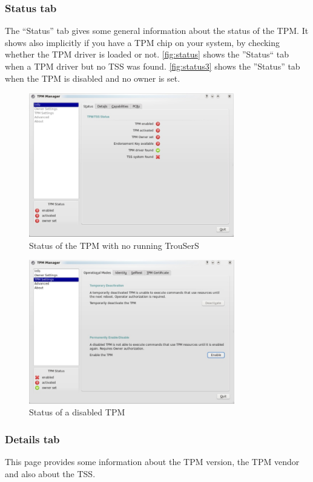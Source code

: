 \documentclass[
  american        %
]{sirrixreport}
\begin{document}
\subsubsection{Status tab} The ``Status'' tab gives some general information about the status of the TPM.
It shows also implicitly if you have a TPM chip on your system, by checking whether the TPM driver is loaded or not. \autoref{fig:status} shows the ''Status`` tab when a TPM driver but no TSS was found. \autoref{fig:status3} shows the ''Status'' tab when the TPM is disabled and no owner is set.
\begin{figure}[h]
 \centering
   \includegraphics[width=0.8\textwidth]{images/man_statnotrousers}
   \caption{Status of the TPM with no running TrouSerS}
\label{fig:status}
\end{figure}
\begin{figure}[h]
 \centering
   \includegraphics[width=0.8\textwidth]{images/man_stattpmdisabled}
   \caption{Status of a disabled TPM}
\label{fig:status3}
\end{figure}
\clearpage

\subsubsection{Details tab} This page provides some information about the TPM version, the TPM vendor and also about the TSS.
\end{document}
